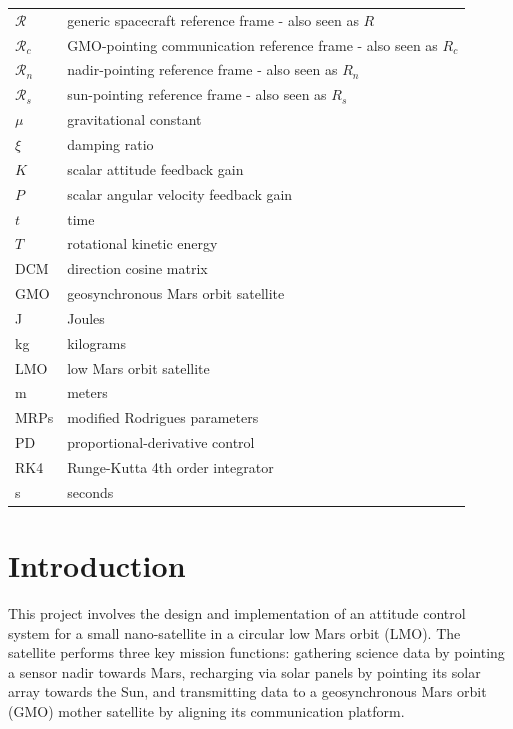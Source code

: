\documentclass[conf]{new-aiaa}
\begin{document}
{\begin{longtable*}{@{}l @{\quad=\quad} l@{}}
$\mathcal{R}$ & generic spacecraft reference frame - also seen as $R$ \\
$\mathcal{R}_c$ & GMO-pointing communication reference frame - also seen as $R_c$ \\
$\mathcal{R}_n$ & nadir-pointing reference frame - also seen as $R_n$ \\
$\mathcal{R}_s$ & sun-pointing reference frame - also seen as $R_s$ \\
$\mu$ & gravitational constant \\
$\xi$ & damping ratio \\
$K$ & scalar attitude feedback gain \\
$P$ & scalar angular velocity feedback gain \\
$t$ & time \\
$T$ & rotational kinetic energy \\
DCM  & direction cosine matrix \\
GMO & geosynchronous Mars orbit satellite \\
J & Joules \\
kg & kilograms \\
LMO & low Mars orbit satellite \\
m & meters \\
MRPs & modified Rodrigues parameters \\
PD & proportional-derivative control \\
RK4 & Runge-Kutta 4th order integrator \\
s & seconds \\
\end{longtable*}}


\section{Introduction}
This project involves the design and implementation of an attitude control system for a small nano-satellite in a circular low Mars orbit (LMO). The satellite performs three key mission functions: gathering science data by pointing a sensor nadir towards Mars, recharging via solar panels by pointing its solar array towards the Sun, and transmitting data to a geosynchronous Mars orbit (GMO) mother satellite by aligning its communication platform.
\end{document}
